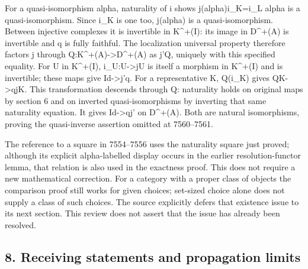 \begingroup\raggedright
For a quasi-isomorphism alpha,\allowbreak{} naturality of i shows j(alpha)\allowbreak{}i\_\allowbreak{}K\allowbreak{}=i\_\allowbreak{}L alpha is a quasi-isomorphism. Since i\_\allowbreak{}K is one too,\allowbreak{} j(alpha)\allowbreak{} is a quasi-isomorphism. Between injective complexes it is invertible in K\textasciicircum{}\allowbreak{}+(I)\allowbreak{}:\allowbreak{} its image in D\textasciicircum{}\allowbreak{}+(A)\allowbreak{} is invertible and q is fully faithful. The localization universal property therefore factors j through Q:\allowbreak{}K\textasciicircum{}\allowbreak{}+(A)\allowbreak{}\allowbreak{}->D\textasciicircum{}\allowbreak{}+(A)\allowbreak{} as j'Q,\allowbreak{} uniquely with this specified equality. For U in K\textasciicircum{}\allowbreak{}+(I)\allowbreak{},\allowbreak{} i\_\allowbreak{}U:\allowbreak{}U\allowbreak{}->jU is itself a morphism in K\textasciicircum{}\allowbreak{}+(I)\allowbreak{} and is invertible; these maps give Id\allowbreak{}->j'q. For a representative K,\allowbreak{} Q(i\_\allowbreak{}K)\allowbreak{} gives QK\allowbreak{}->qjK. This transformation descends through Q:\allowbreak{} naturality holds on original maps by section 6 and on inverted quasi-isomorphisms by inverting that same naturality equation. It gives Id\allowbreak{}->qj' on D\textasciicircum{}\allowbreak{}+(A)\allowbreak{}. Both are natural isomorphisms,\allowbreak{} proving the quasi-inverse assertion omitted at 7560–\allowbreak{}7561.
\par\endgroup

The reference to a square in 7554–\allowbreak{}7556 uses the naturality square just proved; although its explicit alpha-labelled display occurs in the earlier resolution-functor lemma,\allowbreak{} that relation is also used in the exactness proof. This does not require a new mathematical correction. For a category with a proper class of objects the comparison proof still works for given choices; set-sized choice alone does not supply a class of such choices. The source explicitly defers that existence issue to its next section. This review does not assert that the issue has already been resolved.

\subsection{8. Receiving statements and propagation limits}\label{proofs-7096-7578-receiving-statements-and-propagation-limits}

